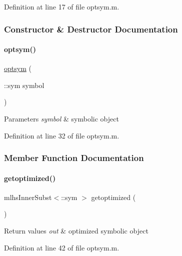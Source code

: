 Definition at line 17 of file optsym.\+m.



\subsubsection{Constructor \& Destructor Documentation}
\mbox{\label{classoptsym_afe9ab2368d1b1705d6a38ae4ed7dcb37}} 
\paragraph{\texorpdfstring{optsym()}{optsym()}}
{\footnotesize\ttfamily \mbox{\hyperlink{classoptsym}{optsym}} (\begin{DoxyParamCaption}\item[{\+::sym}]{symbol }\end{DoxyParamCaption})}


\begin{DoxyParams}{Parameters}
{\em symbol} & symbolic object \\
\hline
\end{DoxyParams}


Definition at line 32 of file optsym.\+m.



\subsubsection{Member Function Documentation}
\mbox{\label{classoptsym_a9025fce18af7d11fcca43332aece29bc}} 
\paragraph{\texorpdfstring{getoptimized()}{getoptimized()}}
{\footnotesize\ttfamily mlhs\+Inner\+Subst$<$\+::sym $>$ getoptimized (\begin{DoxyParamCaption}{ }\end{DoxyParamCaption})}


\begin{DoxyRetVals}{Return values}
{\em out} & optimized symbolic object \\
\hline
\end{DoxyRetVals}


Definition at line 42 of file optsym.\+m.

